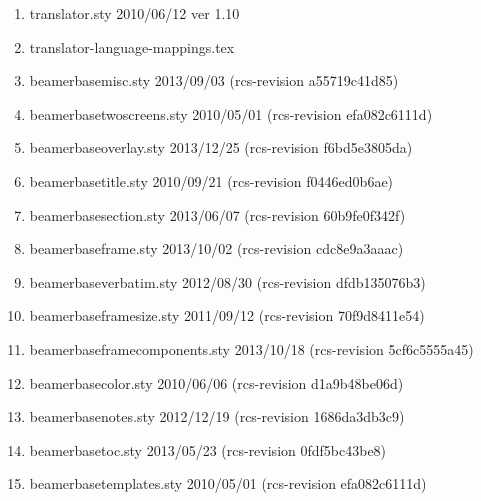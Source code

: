 \begin{enumerate}
\item 		 translator.sty 2010/06/12 ver 1.10
\item 		 translator-language-mappings.tex
\item 		 beamerbasemisc.sty 2013/09/03 (rcs-revision a55719c41d85)
\item 		 beamerbasetwoscreens.sty 2010/05/01 (rcs-revision efa082c6111d)
\item 		 beamerbaseoverlay.sty 2013/12/25 (rcs-revision f6bd5e3805da)
\item beamerbasetitle.sty 2010/09/21 (rcs-revision f0446ed0b6ae)
\item 		 beamerbasesection.sty 2013/06/07 (rcs-revision 60b9fe0f342f)
\item 		 beamerbaseframe.sty 2013/10/02 (rcs-revision cdc8e9a3aaac)
\item 		 beamerbaseverbatim.sty 2012/08/30 (rcs-revision dfdb135076b3)
\item 		 beamerbaseframesize.sty 2011/09/12 (rcs-revision 70f9d8411e54)
\item 		 beamerbaseframecomponents.sty 2013/10/18 (rcs-revision 5cf6c5555a45)
\item 		 beamerbasecolor.sty 2010/06/06 (rcs-revision d1a9b48be06d)
\item 		 beamerbasenotes.sty 2012/12/19 (rcs-revision 1686da3db3c9)
\item 		 beamerbasetoc.sty 2013/05/23 (rcs-revision 0fdf5bc43be8)
\item 		 beamerbasetemplates.sty 2010/05/01 (rcs-revision efa082c6111d)

\end{enumerate}
